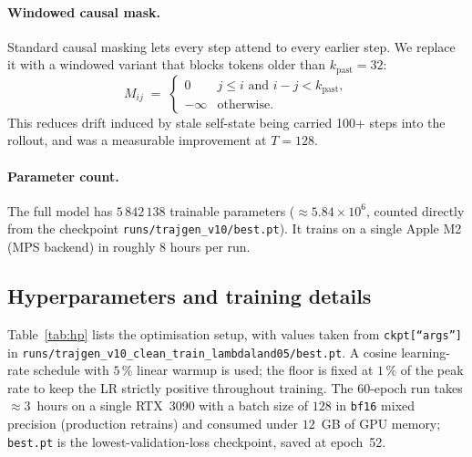 \documentclass[oneside, a4paper, onecolumn, 11pt]{article}
\begin{document}
\paragraph{Windowed causal mask.}
Standard causal masking lets every step attend to every earlier step.
We replace it with a windowed variant that blocks tokens older than
$k_{\mathrm{past}} = 32$:
\[
  M_{ij} \;=\; \begin{cases}
    0 & j \leq i \text{ and } i - j < k_{\mathrm{past}}, \\
    -\infty & \text{otherwise.}
  \end{cases}
\]
This reduces drift induced by stale self-state being carried 100+ steps
into the rollout, and was a measurable improvement at $T = 128$.

\paragraph{Parameter count.}
The full model has $5\,842\,138$ trainable parameters
($\approx 5.84 \times 10^6$, counted directly from the checkpoint
\texttt{runs/trajgen\_v10/best.pt}). It trains on a single Apple M2
(MPS backend) in roughly 8 hours per run.

\subsection{Hyperparameters and training details}\label{sec:hp}

Table~\ref{tab:hp} lists the optimisation setup, with values taken
from \texttt{ckpt[``args'']} in
\texttt{runs/trajgen\_v10\_clean\_train\_lambdaland05/best.pt}.  A
cosine learning-rate schedule with $5\,\%$ linear warmup is used; the
floor is fixed at $1\,\%$ of the peak rate to keep the LR strictly
positive throughout training.  The $60$-epoch run takes
$\approx 3$~hours on a single RTX~3090 with a batch size of $128$ in
\texttt{bf16} mixed precision (production retrains) and consumed under
$12$~GB of GPU memory; \texttt{best.pt} is the lowest-validation-loss
checkpoint, saved at epoch~52.
\end{document}
